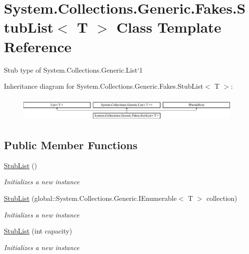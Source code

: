 \hypertarget{class_system_1_1_collections_1_1_generic_1_1_fakes_1_1_stub_list_3_01_t_01_4}{\section{System.\-Collections.\-Generic.\-Fakes.\-Stub\-List$<$ T $>$ Class Template Reference}
\label{class_system_1_1_collections_1_1_generic_1_1_fakes_1_1_stub_list_3_01_t_01_4}
}


Stub type of System.\-Collections.\-Generic.\-List`1 


Inheritance diagram for System.\-Collections.\-Generic.\-Fakes.\-Stub\-List$<$ T $>$\-:\begin{figure}[H]
\begin{center}
\leavevmode
\includegraphics[height=1.278539cm]{class_system_1_1_collections_1_1_generic_1_1_fakes_1_1_stub_list_3_01_t_01_4}
\end{center}
\end{figure}
\subsection*{Public Member Functions}
\begin{DoxyCompactItemize}
\item 
\hyperlink{class_system_1_1_collections_1_1_generic_1_1_fakes_1_1_stub_list_3_01_t_01_4_a8bfb0c37635e37d0e0c160484a39ced2}{Stub\-List} ()
\begin{DoxyCompactList}\small\item\em Initializes a new instance\end{DoxyCompactList}\item 
\hyperlink{class_system_1_1_collections_1_1_generic_1_1_fakes_1_1_stub_list_3_01_t_01_4_a703770df999d1e20157b14e1c26cb50d}{Stub\-List} (global\-::\-System.\-Collections.\-Generic.\-I\-Enumerable$<$ T $>$ collection)
\begin{DoxyCompactList}\small\item\em Initializes a new instance\end{DoxyCompactList}\item 
\hyperlink{class_system_1_1_collections_1_1_generic_1_1_fakes_1_1_stub_list_3_01_t_01_4_a711c2f30bd87699dc343da417afad390}{Stub\-List} (int capacity)
\begin{DoxyCompactList}\small\item\em Initializes a new instance\end{DoxyCompactList}\end{DoxyCompactItemize}
